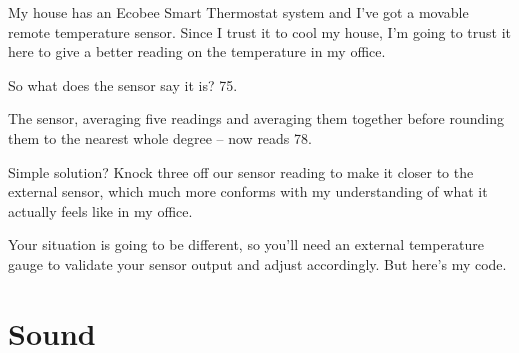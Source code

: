 \documentclass[
]{book}
\newenvironment{Shaded}{\begin{snugshade}}{\end{snugshade}}
\newcommand{\BuiltInTok}[1]{#1}
\newcommand{\CommentTok}[1]{\textcolor[rgb]{0.56,0.35,0.01}{\textit{#1}}}
\newcommand{\ControlFlowTok}[1]{\textcolor[rgb]{0.13,0.29,0.53}{\textbf{#1}}}
\newcommand{\DecValTok}[1]{\textcolor[rgb]{0.00,0.00,0.81}{#1}}
\newcommand{\FloatTok}[1]{\textcolor[rgb]{0.00,0.00,0.81}{#1}}
\newcommand{\ImportTok}[1]{#1}
\newcommand{\KeywordTok}[1]{\textcolor[rgb]{0.13,0.29,0.53}{\textbf{#1}}}
\newcommand{\NormalTok}[1]{#1}
\newcommand{\OperatorTok}[1]{\textcolor[rgb]{0.81,0.36,0.00}{\textbf{#1}}}
\newcommand{\StringTok}[1]{\textcolor[rgb]{0.31,0.60,0.02}{#1}}
\newcommand{\VariableTok}[1]{\textcolor[rgb]{0.00,0.00,0.00}{#1}}
\begin{document}
My house has an Ecobee Smart Thermostat system and I've got a movable remote temperature sensor. Since I trust it to cool my house, I'm going to trust it here to give a better reading on the temperature in my office.

So what does the sensor say it is? 75.

The sensor, averaging five readings and averaging them together before rounding them to the nearest whole degree -- now reads 78.

Simple solution? Knock three off our sensor reading to make it closer to the external sensor, which much more conforms with my understanding of what it actually feels like in my office.

Your situation is going to be different, so you'll need an external temperature gauge to validate your sensor output and adjust accordingly. But here's my code.

\begin{Shaded}
\end{Shaded}

\hypertarget{sound}{%
\chapter{Sound}\label{sound}}
\end{document}
